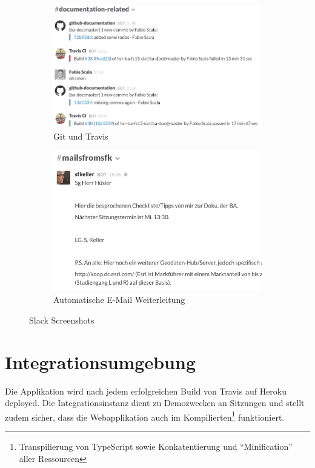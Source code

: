 \begin{figure}[H]
	\centering
	\begin{subfigure}{0.49\textwidth}
		\centering
		\includegraphics[width=\linewidth]{fig/slack-git-travis}
		\caption{Git und Travis}
		\label{fig:pm:slack-git-travis}
	\end{subfigure}
	\begin{subfigure}{0.49\textwidth}
		\centering
		\includegraphics[width=\linewidth]{fig/slack-email}
		\caption{Automatische E-Mail Weiterleitung}
		\label{fig:pm:slack-email}
	\end{subfigure}
	\caption{Slack Screenshots}
	\label{fig:pm:slack}
\end{figure}


\section{Integrationsumgebung}
Die Applikation wird nach jedem erfolgreichen Build von Travis auf Heroku deployed. Die Integrationsinstanz dient zu Demozwecken an Sitzungen und stellt zudem sicher, dass die Webapplikation auch im Kompilierten\footnote{Transpilierung von TypeScript sowie Konkatentierung und ``Minification'' aller Ressourcen} funktioniert.


